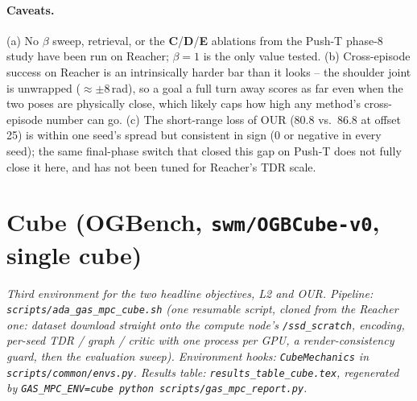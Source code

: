 \documentclass[11pt]{article}
\begin{document}
\paragraph{Caveats.} (a) No $\beta$ sweep, retrieval, or the \textbf{C}/\textbf{D}/\textbf{E}
ablations from the Push-T phase-8 study have been run on Reacher; $\beta=1$ is the only value
tested. (b) Cross-episode success on Reacher is an intrinsically harder bar than it looks --
the shoulder joint is unwrapped ($\approx\pm8$\,rad), so a goal a full turn away scores as far
even when the two poses are physically close, which likely caps how high any method's
cross-episode number can go. (c) The short-range loss of OUR (80.8 vs.\ 86.8 at offset 25) is
within one seed's spread but consistent in sign (0 or negative in every seed); the same
final-phase switch that closed this gap on Push-T does not fully close it here, and has not
been tuned for Reacher's TDR scale.

\section{Cube (OGBench, \texttt{swm/OGBCube-v0}, single cube)}
\label{sec:cube}
\emph{Third environment for the two headline objectives, L2 and OUR. Pipeline:
\texttt{scripts/ada\_gas\_mpc\_cube.sh} (one resumable script, cloned from the Reacher one:
dataset download straight onto the compute node's \texttt{/ssd\_scratch}, encoding, per-seed
TDR / graph / critic with one process per GPU, a render-consistency guard, then the evaluation
sweep). Environment hooks: \texttt{CubeMechanics} in \texttt{scripts/common/envs.py}. Results
table: \texttt{results\_table\_cube.tex}, regenerated by \texttt{GAS\_MPC\_ENV=cube python
scripts/gas\_mpc\_report.py}.}
\end{document}
